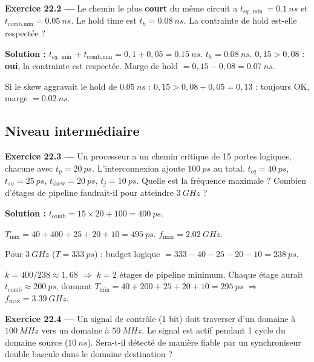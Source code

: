 \documentclass[12pt,a4paper,twoside]{book}
\begin{document}
\textbf{Exercice 22.2 ---} Le chemin le plus \textbf{court} du même circuit a $t_{cq,\min} = \SI{0.1}{ns}$ et $t_{\text{comb,min}} = \SI{0.05}{ns}$. Le hold time est $t_h = \SI{0.08}{ns}$. La contrainte de hold est-elle respectée ?

\begin{pratique}
\textbf{Solution :} $t_{cq,\min} + t_{\text{comb,min}} = 0{,}1 + 0{,}05 = \SI{0.15}{ns}$. $t_h = \SI{0.08}{ns}$. $0{,}15 > 0{,}08$ : \textbf{oui}, la contrainte est respectée. Marge de hold $= 0{,}15 - 0{,}08 = \SI{0.07}{ns}$.

Si le skew aggravait le hold de $\SI{0.05}{ns}$ : $0{,}15 > 0{,}08 + 0{,}05 = 0{,}13$ : toujours OK, marge $= \SI{0.02}{ns}$.
\end{pratique}

\subsection*{Niveau intermédiaire}

\textbf{Exercice 22.3 ---} Un processeur a un chemin critique de 15 portes logiques, chacune avec $t_p = \SI{20}{ps}$. L'interconnexion ajoute $\SI{100}{ps}$ au total. $t_{cq} = \SI{40}{ps}$, $t_{su} = \SI{25}{ps}$, $t_{\text{skew}} = \SI{20}{ps}$, $t_j = \SI{10}{ps}$. Quelle est la fréquence maximale ? Combien d'étages de pipeline faudrait-il pour atteindre $\SI{3}{GHz}$ ?

\begin{pratique}
\textbf{Solution :} $t_{\text{comb}} = 15\times20 + 100 = \SI{400}{ps}$.

$T_{\min} = 40 + 400 + 25 + 20 + 10 = \SI{495}{ps}$. $f_{\max} = \SI{2.02}{GHz}$.

Pour $\SI{3}{GHz}$ ($T = \SI{333}{ps}$) : budget logique $= 333 - 40 - 25 - 20 - 10 = \SI{238}{ps}$.

$k = 400/238 \approx 1{,}68$ $\Rightarrow$ $k = 2$ étages de pipeline minimum. Chaque étage aurait $t_{\text{comb}} \approx \SI{200}{ps}$, donnant $T_{\min} = 40 + 200 + 25 + 20 + 10 = \SI{295}{ps}$ $\Rightarrow$ $f_{\max} = \SI{3.39}{GHz}$.
\end{pratique}

\textbf{Exercice 22.4 ---} Un signal de contrôle (1 bit) doit traverser d'un domaine à $\SI{100}{MHz}$ vers un domaine à $\SI{50}{MHz}$. Le signal est actif pendant 1 cycle du domaine source ($\SI{10}{ns}$). Sera-t-il détecté de manière fiable par un synchroniseur double bascule dans le domaine destination ?
\end{document}
